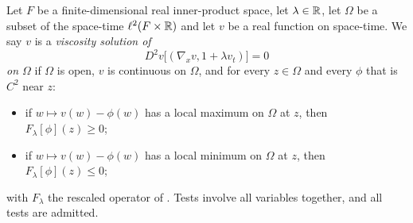 \begin{definition}
Let $F$ be a finite-dimensional real inner-product space, let $\lambda\in\mathbb{R}$,
let $\Omega$ be a subset of the space-time $\ell^2(F\times\mathbb{R})$ and let $v$ be a
real function on space-time. We say $v$ is a \emph{viscosity solution of}
\[
  D^2v\bigl[(\nabla_xv,1+\lambda v_t)\bigr]=0
\]
\emph{on $\Omega$} if $\Omega$ is open, $v$ is continuous on $\Omega$, and for
every $z\in\Omega$ and every $\phi$ that is $C^2$ near $z$:
\begin{itemize}
\item if $w\mapsto v(w)-\phi(w)$ has a local maximum on $\Omega$ at $z$, then
$F_\lambda[\phi](z)\ge0$;
\item if $w\mapsto v(w)-\phi(w)$ has a local minimum on $\Omega$ at $z$, then
$F_\lambda[\phi](z)\le0$;
\end{itemize}
with $F_\lambda$ the rescaled operator of . Tests involve all
variables together, and all tests are admitted.
\end{definition}
